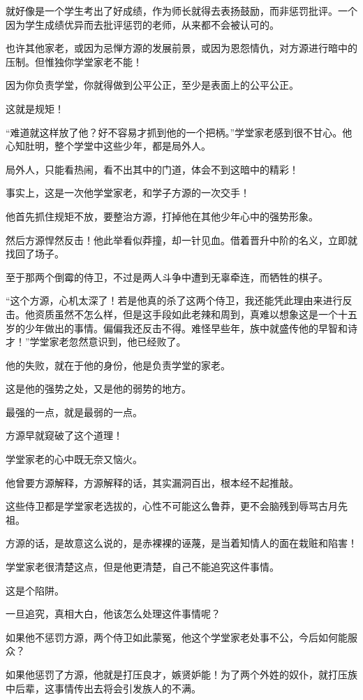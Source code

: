 \begin{this_body}
就好像是一个学生考出了好成绩，作为师长就得去表扬鼓励，而非惩罚批评。一个因为学生成绩优异而去批评惩罚的老师，从来都不会被认可的。

也许其他家老，或因为忌惮方源的发展前景，或因为恩怨情仇，对方源进行暗中的压制。但惟独你学堂家老不能！

因为你负责学堂，你就得做到公平公正，至少是表面上的公平公正。

这就是规矩！

“难道就这样放了他？好不容易才抓到他的一个把柄。”学堂家老感到很不甘心。他心知肚明，整个学堂中这些少年，都是局外人。

局外人，只能看热闹，看不出其中的门道，体会不到这暗中的精彩！

事实上，这是一次他学堂家老，和学子方源的一次交手！

他首先抓住规矩不放，要整治方源，打掉他在其他少年心中的强势形象。

然后方源悍然反击！他此举看似莽撞，却一针见血。借着晋升中阶的名义，立即就找回了场子。

至于那两个倒霉的侍卫，不过是两人斗争中遭到无辜牵连，而牺牲的棋子。

“这个方源，心机太深了！若是他真的杀了这两个侍卫，我还能凭此理由来进行反击。他资质虽然不怎么样，但是这手段如此老辣和周到，真难以想象这是一个十五岁的少年做出的事情。偏偏我还反击不得。难怪早些年，族中就盛传他的早智和诗才！”学堂家老忽然意识到，他已经败了。

他的失败，就在于他的身份，他是负责学堂的家老。

这是他的强势之处，又是他的弱势的地方。

最强的一点，就是最弱的一点。

方源早就窥破了这个道理！

学堂家老的心中既无奈又恼火。

他曾要方源解释，方源解释的话，其实漏洞百出，根本经不起推敲。

这些侍卫都是学堂家老选拔的，心性不可能这么鲁莽，更不会脑残到辱骂古月先祖。

方源的话，是故意这么说的，是赤裸裸的诬蔑，是当着知情人的面在栽赃和陷害！

学堂家老很清楚这点，但是他更清楚，自己不能追究这件事情。

这是个陷阱。

一旦追究，真相大白，他该怎么处理这件事情呢？

如果他不惩罚方源，两个侍卫如此蒙冤，他这个学堂家老处事不公，今后如何能服众？

如果他惩罚了方源，他就是打压良才，嫉贤妒能！为了两个外姓的奴仆，就打压族中后辈，这事情传出去将会引发族人的不满。


\end{this_body}
